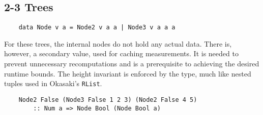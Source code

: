\subsection{2-3 Trees}

\begin{verbatim}
    data Node v a = Node2 v a a | Node3 v a a a
\end{verbatim}

For these trees, the internal nodes do not hold any actual data. There is, however, a secondary value, used for caching measurements. It is needed to prevent unnecessary recomputations and is a prerequisite to achieving the desired runtime bounds. The height invariant is enforced by the type, much like nested tuples used in Okasaki's \texttt{RList}.

\begin{verbatim}
    Node2 False (Node3 False 1 2 3) (Node2 False 4 5) 
        :: Num a => Node Bool (Node Bool a)
\end{verbatim}